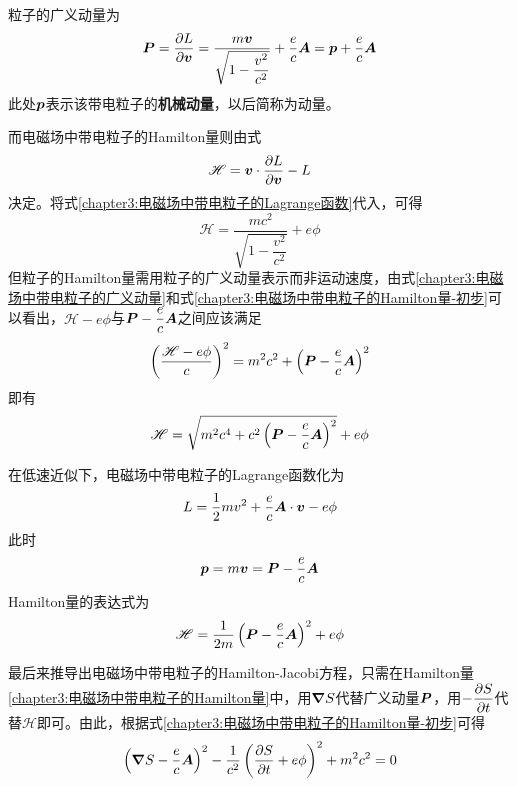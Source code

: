 粒子的广义动量为
\begin{equation}
	\boldsymbol{P} = \frac{\partial L}{\partial \boldsymbol{v}} = \frac{m\boldsymbol{v}}{\sqrt{1-\dfrac{v^2}{c^2}}} + \frac{e}{c}\boldsymbol{A} = \boldsymbol{p}+\frac{e}{c}\boldsymbol{A}
	\label{chapter3:电磁场中带电粒子的广义动量}
\end{equation}
此处$\boldsymbol{p}$表示该带电粒子的{\bf 机械动量}，以后简称为动量。

而电磁场中带电粒子的Hamilton量则由式
\begin{equation*}
	\mathscr{H} = \boldsymbol{v}\cdot \frac{\partial L}{\partial \boldsymbol{v}} - L
\end{equation*}
决定。将式\eqref{chapter3:电磁场中带电粒子的Lagrange函数}代入，可得
\begin{equation}
	\mathscr{H} = \frac{mc^2}{\sqrt{1-\dfrac{v^2}{c^2}}}+e\phi
	\label{chapter3:电磁场中带电粒子的Hamilton量-用速度表示的Hamilton量}
\end{equation}
但粒子的Hamilton量需用粒子的广义动量表示而非运动速度，由式\eqref{chapter3:电磁场中带电粒子的广义动量}和式\eqref{chapter3:电磁场中带电粒子的Hamilton量-初步}可以看出，$\mathscr{H}-e\phi$与$\boldsymbol{P}-\dfrac{e}{c}\boldsymbol{A}$之间应该满足
\begin{equation}
	\left(\frac{\mathscr{H}-e\phi}{c}\right)^2 = m^2c^2+\left(\boldsymbol{P}-\dfrac{e}{c}\boldsymbol{A}\right)^2
	\label{chapter3:电磁场中带电粒子的Hamilton量-初步}
\end{equation}
即有
\begin{equation}
	\mathscr{H} = \sqrt{m^2c^4+c^2\left(\boldsymbol{P}-\dfrac{e}{c}\boldsymbol{A}\right)^2}+e\phi
	\label{chapter3:电磁场中带电粒子的Hamilton量}
\end{equation}

在低速近似下，电磁场中带电粒子的Lagrange函数化为
\begin{equation}
	L = \frac12mv^2+\dfrac{e}{c}\boldsymbol{A}\cdot \boldsymbol{v}-e\phi
	\label{chapter3:低速近似下，电磁场中带电粒子的Lagrange函数}
\end{equation}
此时
\begin{equation*}
	\boldsymbol{p} = m\boldsymbol{v} = \boldsymbol{P}-\dfrac{e}{c}\boldsymbol{A}
\end{equation*}
Hamilton量的表达式为
\begin{equation}
	\mathscr{H} = \frac{1}{2m}\left(\boldsymbol{P}-\dfrac{e}{c}\boldsymbol{A}\right)^2 + e\phi
	\label{chapter3:低速近似下，电磁场中带电粒子的Hamilton量}
\end{equation}

最后来推导出电磁场中带电粒子的Hamilton-Jacobi方程，只需在Hamilton量\eqref{chapter3:电磁场中带电粒子的Hamilton量}中，用$\boldsymbol{\nabla} S$代替广义动量$\boldsymbol{P}$，用$-\dfrac{\partial S}{\partial t}$代替$\mathscr{H}$即可。由此，根据式\eqref{chapter3:电磁场中带电粒子的Hamilton量-初步}可得
\begin{equation}
	\left(\boldsymbol{\nabla} S-\dfrac{e}{c}\boldsymbol{A}\right)^2-\frac{1}{c^2}\left(\frac{\partial S}{\partial t} + e\phi\right)^2 + m^2c^2 = 0
	\label{chapter3:电磁场中带电粒子的Hamilton-Jacobi方程}
\end{equation}

